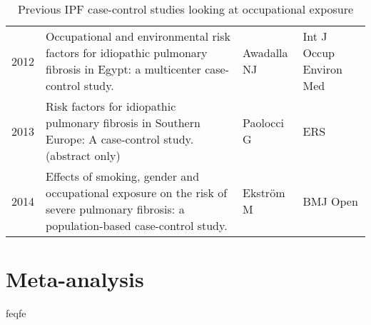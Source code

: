 \documentclass[a4paper,12pt]{article}
\begin{document}
\begin{table}
\begin{tabular}{lp{6cm}ll}
    2012    &                Occupational and environmental risk factors for idiopathic pulmonary fibrosis in Egypt: a multicenter case-control study. &                Awadalla NJ &     Int J Occup Environ Med \\
        2013    &                                           Risk factors for idiopathic pulmonary fibrosis in Southern Europe: A case-control study. (abstract only) &                  Paolocci G &      ERS  \\
    2014    &    Effects of smoking, gender and occupational exposure on the risk of severe pulmonary fibrosis: a population-based case-control study. &                  Ekström M &                    BMJ Open \\
    \bottomrule
    \end{tabular}
    \caption{Previous IPF case-control studies looking at occupational exposure}
\end{table}

\section{Meta-analysis}
feqfe

\makeatletter
 \def\@biblabel#1{#1}
\makeatother



\end{document}
